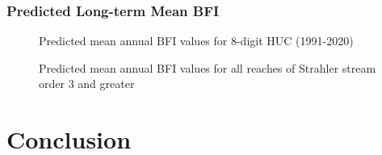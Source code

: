 \documentclass[
]{agujournal2019}
\begin{document}
\subsubsection{Predicted Long-term Mean
BFI}\label{predicted-long-term-mean-bfi}

\begin{figure}


\caption{\label{fig-bfi-huc}Predicted mean annual BFI values for 8-digit
HUC (1991-2020)}

\end{figure}%

\begin{figure}


\caption{\label{fig-bfi-streams}Predicted mean annual BFI values for all
reaches of Strahler stream order 3 and greater}

\end{figure}%

\section{Conclusion}\label{sec-conclusion}
\end{document}
